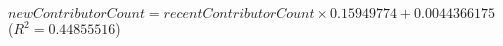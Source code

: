 $\mathit{newContributorCount} = \mathit{recentContributorCount} \times 0.15949774 + 0.0044366175$\\($R^2 = 0.44855516$)